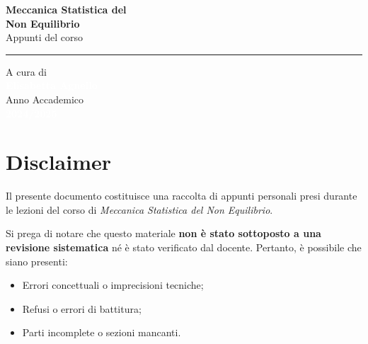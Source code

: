 \documentclass[12pt, a4paper]{book}
\begin{document}
\begin{titlepage}
\begin{flushleft}
        \vspace{2.5cm}
        
        \textcolor{colorE}{\sffamily\fontsize{60}{70}\selectfont\textbf{Meccanica Statistica del}}\\[0.1cm]
        \textcolor{colorE}{\sffamily\fontsize{60}{70}\selectfont\textbf{Non Equilibrio}}\\[0.6cm]
        \textcolor{white!80}{\sffamily\Large Appunti del corso}\\[0.5cm]
        \textcolor{white!30}{\rule{6cm}{1pt}} %
    \end{flushleft}
    
    \vfill %
    
    \begin{flushleft}
        \textcolor{white!60}{\sffamily\large A cura di}\\[0.2cm]
        \textcolor{white}{\sffamily\huge\textbf{Elisabetta Agnello}}\\[1.2cm]
        
        \textcolor{white!60}{\sffamily\large Anno Accademico}\\[0.2cm]
        \textcolor{white}{\sffamily\Large\textbf{2024/2025}}
    \end{flushleft}
    
    \vspace*{1cm} %
\end{titlepage}
    

\frontmatter %
\chapter*{Disclaimer}
\thispagestyle{empty} %

Il presente documento costituisce una raccolta di appunti personali presi durante le lezioni del corso di \textit{Meccanica Statistica del Non Equilibrio}. 

Si prega di notare che questo materiale \textbf{non è stato sottoposto a una revisione sistematica} né è stato verificato dal docente. Pertanto, è possibile che siano presenti:
\begin{itemize}
    \item Errori concettuali o imprecisioni tecniche;
    \item Refusi o errori di battitura;
    \item Parti incomplete o sezioni mancanti.
\end{itemize}
\end{document}
